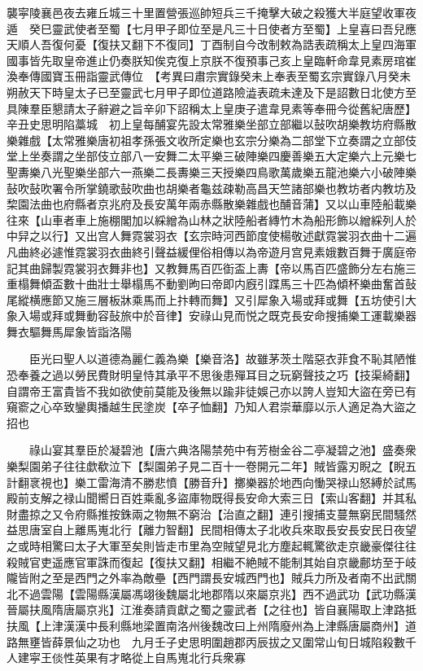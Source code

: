 襲寜陵襄邑夜去雍丘城三十里置營張巡帥短兵三千掩擊大破之殺獲大半庭望收軍夜遁　癸巳靈武使者至蜀【七月甲子即位至是凡三十日使者方至蜀】上皇喜曰吾兒應天順人吾復何憂【復扶又翻下不復同】丁酉制自今改制敕為誥表疏稱太上皇四海軍國事皆先取皇帝進止仍奏朕知俟克復上京朕不復預事己亥上皇臨軒命韋見素房琯崔渙奉傳國寶玉冊詣靈武傳位　【考異曰肅宗實錄癸未上奉表至蜀玄宗實錄八月癸未朔赦天下時皇太子已至靈武七月甲子即位道路險澁表疏未達及下是詔數日北使方至具陳羣臣懇請太子辭避之旨辛卯下詔稱太上皇庚子遣韋見素等奉冊今從舊紀唐歷】　辛丑史思明陷藁城　初上皇每酺宴先設太常雅樂坐部立部繼以鼔吹胡樂教坊府縣散樂雜戲【太常雅樂唐初祖孝孫張文收所定樂也玄宗分樂為二部堂下立奏謂之立部伎堂上坐奏謂之坐部伎立部八一安舞二太平樂三破陣樂四慶善樂五大定樂六上元樂七聖夀樂八光聖樂坐部六一燕樂二長夀樂三天授樂四鳥歌萬歲樂五龍池樂六小破陣樂鼔吹鼔吹署令所掌鐃歌鼔吹曲也胡樂者龜兹疎勒高昌天竺諸部樂也教坊者内教坊及棃園法曲也府縣者京兆府及長安萬年兩赤縣散樂雜戲也酺音蒲】又以山車陸船載樂往來【山車者車上施棚閣加以綵繒為山林之狀陸船者縳竹木為船形飾以繒綵列人於中舁之以行】又出宫人舞霓裳羽衣【玄宗時河西節度使楊敬述獻霓裳羽衣曲十二遍凡曲終必遽惟霓裳羽衣曲終引聲益緩俚俗相傳以為帝遊月宫見素娥數百舞于廣庭帝記其曲歸製霓裳羽衣舞非也】又教舞馬百匹衘盃上夀【帝以馬百匹盛飾分左右施三重榻舞傾盃數十曲壯士舉榻馬不動劉昫曰帝即内廐引蹀馬三十匹為傾杯樂曲奮首鼔尾縱横應節又施三層板牀乘馬而上抃轉而舞】又引犀象入場或拜或舞【五坊使引大象入場或拜或舞動容鼔旅中於音律】安祿山見而悦之既克長安命搜捕樂工運載樂器舞衣驅舞馬犀象皆詣洛陽

　　臣光曰聖人以道德為麗仁義為樂【樂音洛】故雖茅茨土階惡衣菲食不恥其陋惟恐奉養之過以勞民費財明皇恃其承平不思後患殫耳目之玩窮聲技之巧【技渠綺翻】自謂帝王富貴皆不我如欲使前莫能及後無以踰非徒娛己亦以誇人豈知大盜在旁已有窺窬之心卒致鑾輿播越生民塗炭【卒子恤翻】乃知人君崇華靡以示人適足為大盜之招也

　　祿山宴其羣臣於凝碧池【唐六典洛陽禁苑中有芳樹金谷二亭凝碧之池】盛奏衆樂梨園弟子往往歔欷泣下【梨園弟子見二百十一卷開元二年】賊皆露刃睨之【睨五計翻衺視也】樂工雷海清不勝悲憤【勝音升】擲樂器於地西向慟哭禄山怒縛於試馬殿前支解之禄山聞嚮日百姓乘亂多盜庫物既得長安命大索三日【索山客翻】并其私財盡掠之又令府縣推按銖兩之物無不窮治【治直之翻】連引搜捕支蔓無窮民間騷然益思唐室自上離馬嵬北行【離力智翻】民間相傳太子北收兵來取長安長安民日夜望之或時相驚曰太子大軍至矣則皆走市里為空賊望見北方塵起輒驚欲走京畿豪傑往往殺賊官吏遥應官軍誅而復起【復扶又翻】相繼不絶賊不能制其始自京畿鄜坊至于岐隴皆附之至是西門之外率為敵壘【西門謂長安城西門也】賊兵力所及者南不出武關北不過雲陽【雲陽縣漢屬馮翊後魏屬北地郡隋以來屬京兆】西不過武功【武功縣漢晉屬扶風隋唐屬京兆】江淮奏請貢獻之蜀之靈武者【之往也】皆自襄陽取上津路抵扶風【上津漢漢中長利縣地梁置南洛州後魏改曰上州隋廢州為上津縣唐屬商州】道路無壅皆薛景仙之功也　九月壬子史思明圍趙郡丙辰拔之又圍常山旬日城陷殺數千人建寜王倓性英果有才略從上自馬嵬北行兵衆寡


